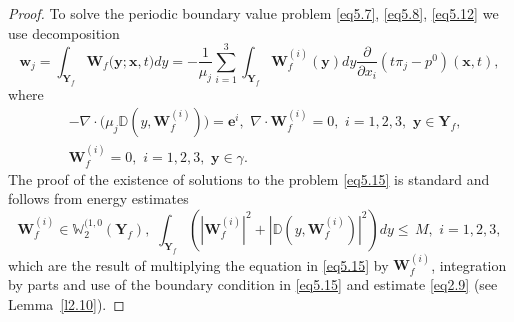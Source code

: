\documentclass[10pt,a4paper]{amsart}
\begin{document}
\begin{proof}
To solve the periodic boundary value problem \eqref{eq5.7}, \eqref{eq5.8}, \eqref{eq5.12} we use decomposition
\begin{equation}\label{eq5.14}
\boldsymbol{w}_{j}=\int_{\textbf{Y}_{f}}\boldsymbol{W}_{f}\big(\boldsymbol{y};\boldsymbol{x},t\big)dy=
-\frac{1}{\mu_{j}}\sum_{i=1}^{3}\int_{\textbf{Y}_{f}}\boldsymbol{W}_{f}^{(i)}(\boldsymbol{y})dy
\frac{\partial}{\partial{x_{i}}}({t\pi}_{j}-{p}^{0})
(\boldsymbol{x},t),
\end{equation}
where
\begin{equation}\label{eq5.15}
\begin{aligned}
& 
-\nabla\cdot\big(\mu_{j}\mathbb{D}(y,\boldsymbol{W}_{f}^{(i)})\big)=\boldsymbol{e}^{i},\,\,
\nabla\cdot\boldsymbol{W}_{f}^{(i)}=0,\,\,i=1,2,3,\,\,\boldsymbol{y}\in\textbf{Y}_{f},
\\
& \boldsymbol{W}_{f}^{(i)}=0,\,\,i=1,2,3,\,\,\boldsymbol{y}\in\gamma.
\end{aligned}
\end{equation}
The proof of the existence of solutions to the problem \eqref{eq5.15} is standard and follows from energy estimates
\begin{equation*}
\boldsymbol{W}_{f}^{(i)}\in\mathbb{W}^{(1,0}_{2}(\textbf{Y}_{f}),\,\,
\int_{\textbf{Y}_{f}}(|\boldsymbol{W}_{f}^{(i)}|^{2}+|\mathbb{D}(y,\boldsymbol{W}_{f}^{(i)})|^{2})dy
\leqslant\,{M},\,\,i=1,2,3,
\end{equation*}
which are the result of multiplying the equation in \eqref{eq5.15} by $\boldsymbol{W}_{f}^{(i)}$, integration by parts and use of the boundary condition in \eqref{eq5.15} and estimate \eqref{eq2.9} (see Lemma~\ref{l2.10}).


\end{proof}
\end{document}
